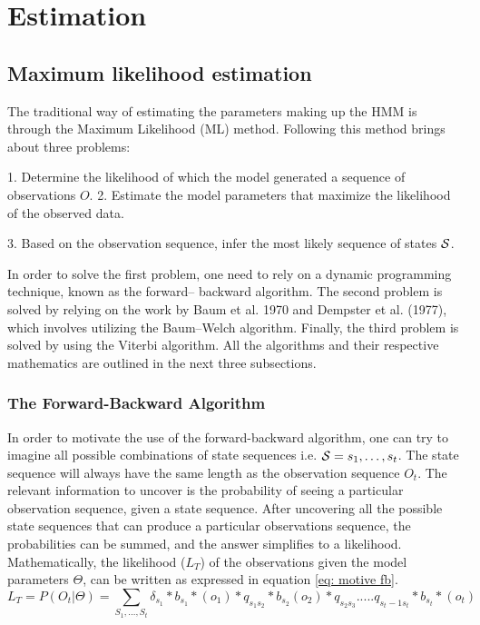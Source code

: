 \section{Estimation}
\label{section: estimation}

\subsection{Maximum likelihood estimation}
The traditional way of estimating the parameters making up the HMM is through the Maximum Likelihood
(ML) method. Following this method brings about three problems:

    1. Determine the likelihood of which the model generated a sequence of  observations $O$. 
    2. Estimate the model parameters that maximize the likelihood of the observed data.

    3. Based on the observation sequence, infer the most likely sequence of states $\S$.
\label{subsection: MLE}
 
In order to solve the first problem, one need to rely on a dynamic programming technique, known as the forward–
backward algorithm. The second problem is solved by relying on the work by Baum et al. 1970 and Dempster et al. (1977), which involves utilizing the Baum–Welch
algorithm. Finally, the third problem is solved by using the Viterbi algorithm. All the algorithms and their respective mathematics are outlined in the next three subsections. 
 
\subsubsection{The Forward-Backward Algorithm}
\label{Section: Forward backward}
In order to motivate the use of the forward-backward algorithm, one can try to imagine all possible combinations of state sequences i.e. $\S = s_1,\ldots,s_t$. The state sequence will always have the same length as the observation sequence $O_t$. The relevant information to uncover is the probability of seeing a particular observation sequence, given a state sequence. After uncovering all the possible state sequences that can produce a particular observations sequence, the probabilities can be summed, and the answer simplifies to a likelihood. Mathematically, the likelihood ($L_T$) of the observations given the model parameters $\Theta$, can be written as expressed in equation \ref{eq: motive fb}.
\begin{equation}
    L_T = P(O_t|\Theta) = \sum_{S_1,\ldots,S_t} \delta_{s_1}*b_{s_1}*(o_1) * q_{s_1s_2} * b_{s_2}(o_2)*q_{s_2s_3} .....q_{s_t-1 s_t}*b_{s_t}*(o_t)
    \label{eq: motive fb}
\end{equation}

